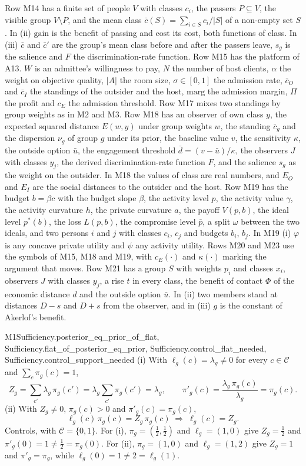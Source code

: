 Row M14 has a finite set of people $V$ with classes $c_i$, the passers
$P\subseteq V$, the visible group $V\setminus P$, and the mean class
$\bar c(S)=\sum_{i\in S}c_i/|S|$ of a non-empty set $S$. In (ii)
$\mathrm{gain}$ is the benefit of passing and $\mathrm{cost}$ its cost, both
functions of class. In (iii) $\bar c$ and $\bar c'$ are the group's mean
class before and after the passers leave, $s_g$ is the salience and $F$ the
discrimination-rate function. Row M15 has the platform of A13. $W$ is
an admittee's willingness to pay, $N$ the number of host clients, $\alpha$
the weight on objective quality, $|A|$ the room size, $\sigma\in[0,1]$ the
admission rate, $\bar c_O$ and $\bar c_I$ the standings of the outsider and
the host, $\mathrm{marg}$ the admission margin, $\Pi$ the profit and $c_E$
the admission threshold. Row M17 mixes two standings by group weights as in
M2 and M3. Row M18 has an observer of own class $y$, the expected squared
distance $E(w,y)$ under group weights $w$, the standing $\bar c_g$ and the
dispersion $\nu_g$ of group $g$ under its prior, the baseline value $v$, the
sensitivity $\kappa$, the outside option $\bar u$, the engagement threshold
$\bar d=(v-\bar u)/\kappa$, the observers $J$ with classes $y_j$, the derived
discrimination-rate function $F$, and the salience $s_g$ as the weight on
the outsider. In M18 the values of class are real numbers, and $E_O$ and
$E_I$ are the social distances to the outsider and the host. Row M19 has
the budget $b=\beta c$ with the budget slope $\beta$, the activity level
$p$, the activity value $\gamma$, the activity curvature $h$, the private
curvature $a$, the payoff $V(p,b)$, the ideal level $p^*(b)$, the loss
$L(p,b)$, the compromise level $\bar p$, a split $\omega$ between the two
ideals, and two persons $i$ and $j$ with classes $c_i$, $c_j$ and budgets
$b_i$, $b_j$. In M19 (i) $\varphi$ is any concave private utility and $\psi$
any activity utility. Rows M20 and M23 use the symbols of M15, M18 and M19, with
$c_E(\cdot)$ and $\kappa(\cdot)$ marking the argument that moves. Row M21
has a group $S$ with weights $p_i$ and classes $x_i$, observers $J$ with
classes $y_j$, a rise $t$ in every class, the benefit of contact $\Phi$ of
the economic distance $d$ and the outside option $\bar u$. In (ii) two members
stand at distances $D-s$ and $D+s$ from the observer, and in (iii) $g$ is
the constant of Akerlof's benefit.

\begin{mproof}{M1}{Sufficiency.posterior_eq_prior_of_flat, Sufficiency.flat_of_posterior_eq_prior, Sufficiency.control_flat_needed, Sufficiency.control_support_needed}
(i) With $\ell_g(c)=\lambda_g\neq0$ for every $c\in\mathcal{C}$ and $\sum_c\pi_g(c)=1$,
\[
Z_g=\sum_{c'}\lambda_g\,\pi_g(c')=\lambda_g\sum_{c'}\pi_g(c')=\lambda_g,
\qquad
\pi'_g(c)=\frac{\lambda_g\,\pi_g(c)}{\lambda_g}=\pi_g(c).
\]
(ii) With $Z_g\neq0$, $\pi_g(c)>0$ and $\pi'_g(c)=\pi_g(c)$,
\[
\ell_g(c)\,\pi_g(c)=Z_g\,\pi_g(c)
\;\Longrightarrow\;
\ell_g(c)=Z_g .
\]
Controls, with $\mathcal{C}=\{0,1\}$. For (i), $\pi_g=(\tfrac12,\tfrac12)$ and
$\ell_g=(1,0)$ give $Z_g=\tfrac12$ and $\pi'_g(0)=1\neq\tfrac12=\pi_g(0)$. For
(ii), $\pi_g=(1,0)$ and $\ell_g=(1,2)$ give $Z_g=1$ and $\pi'_g=\pi_g$, while
$\ell_g(0)=1\neq2=\ell_g(1)$.
\end{mproof}

